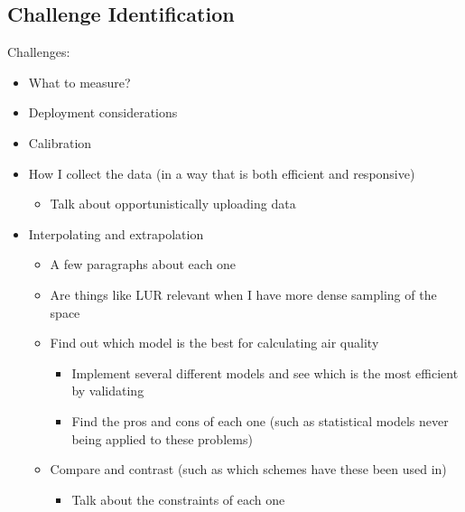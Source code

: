 \subsection{Challenge Identification}\label{challenges}

Challenges:

\begin{itemize}
	\item What to measure?
	\item Deployment considerations
	\item Calibration
	\item How I collect the data (in a way that is both efficient and responsive)
	\begin{itemize}
		\item Talk about opportunistically uploading data
	\end{itemize}
	\item Interpolating and extrapolation
	\begin{itemize}
	    \item A few paragraphs about each one
	    \item Are things like LUR relevant when I have more dense sampling of the space
	    \item Find out which model is the best for calculating air quality
	    \begin{itemize}
	        \item Implement several different models and see which is the most efficient by validating
	        \item Find the pros and cons of each one (such as statistical models never being applied to these problems)
	    \end{itemize}
	    \item Compare and contrast (such as which schemes have these been used in)
	    \begin{itemize}
	        \item Talk about the constraints of each one
	    \end{itemize}
	\end{itemize}
\end{itemize}


